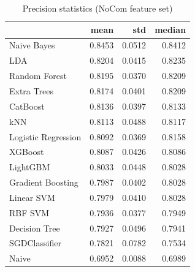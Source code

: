 \begin{table}
\caption{Precision statistics (NoCom feature set)}
\label{tab:precision_NoCom_stats}
\begin{tabular}{lrrr}
\toprule
 & mean & std & median \\
\midrule
Naive Bayes & 0.8453 & 0.0512 & 0.8412 \\
LDA & 0.8204 & 0.0415 & 0.8235 \\
Random Forest & 0.8195 & 0.0370 & 0.8209 \\
Extra Trees & 0.8174 & 0.0401 & 0.8209 \\
CatBoost & 0.8136 & 0.0397 & 0.8133 \\
kNN & 0.8113 & 0.0488 & 0.8117 \\
Logistic Regression & 0.8092 & 0.0369 & 0.8158 \\
XGBoost & 0.8087 & 0.0426 & 0.8086 \\
LightGBM & 0.8033 & 0.0448 & 0.8028 \\
Gradient Boosting & 0.7987 & 0.0402 & 0.8028 \\
Linear SVM & 0.7979 & 0.0410 & 0.8028 \\
RBF SVM & 0.7936 & 0.0377 & 0.7949 \\
Decision Tree & 0.7927 & 0.0496 & 0.7941 \\
SGDClassifier & 0.7821 & 0.0782 & 0.7534 \\
Naive & 0.6952 & 0.0088 & 0.6989 \\
\bottomrule
\end{tabular}
\end{table}
